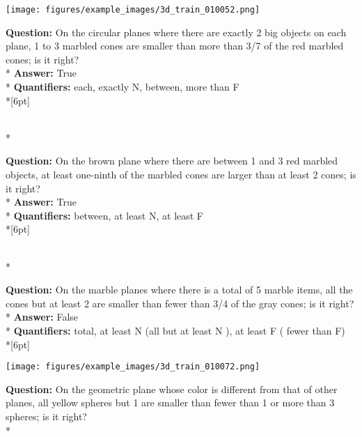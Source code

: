\begin{figure*}
  \begin{minipage}{0.48\textwidth}
    \texttt{[image: figures/example\_images/3d\_train\_010052.png]}
    \begin{minipage}[t][2.2cm][t]{1\textwidth}
      \footnotesize
      \textbf{Question:} On the circular planes where there are exactly 2 big objects on each plane, 1 to 3 marbled cones are smaller than more than 3/7 of the red marbled cones; is it right? \\*
      \textbf{Answer:}  True \\*
      \textbf{Quantifiers:} each, exactly N, between, more than F \\*[6pt]
    \end{minipage}\\*
    \begin{minipage}[t][2.2cm][t]{1\textwidth}
      \footnotesize
      \textbf{Question:} On the brown plane where there are between 1 and 3 red marbled objects, at least one-ninth of the marbled cones are larger than at least 2 cones; is it right? \\*
      \textbf{Answer:} True \\*
      \textbf{Quantifiers:} between, at least N, at least F \\*[6pt]
    \end{minipage}\\*
    \begin{minipage}[t][2.2cm][t]{1\textwidth}
      \footnotesize
      \textbf{Question:} On the marble planes where there is a total of 5 marble items, all the cones but at least 2 are smaller than fewer than 3/4 of the gray cones; is it right? \\*
      \textbf{Answer:} False \\*
      \textbf{Quantifiers:} total, at least N (all but at least N ), at least F ( fewer than F)\\*[6pt]
    \end{minipage}
  \end{minipage}
  \hspace{3.5mm}
  \begin{minipage}{0.48\textwidth}
    \texttt{[image: figures/example\_images/3d\_train\_010072.png]}
    \begin{minipage}[t][2.2cm][t]{1\textwidth}
      \footnotesize
      \textbf{Question:} On the geometric plane whose color is different from that of other planes, all yellow spheres but 1 are smaller than fewer than 1 or more than 3 spheres; is it right? \\*

\end{minipage}
\end{minipage}
\end{figure*}
